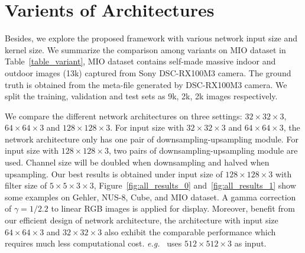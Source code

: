 \documentclass[10pt,twocolumn,letterpaper]{article}
\begin{document}
\section{Varients of Architectures}
Besides, we explore the proposed framework with various network input size and kernel size.
We summarize the comparison among variants on MIO dataset in Table~\ref{table_variant},
MIO dataset contains self-made massive indoor and outdoor images (13k) captured from Sony DSC-RX100M3 camera.
The ground truth is obtained from the meta-file generated by DSC-RX100M3 camera.
We split the training, validation and test sets as 9k, 2k, 2k images respectively.

We compare the different network architectures on three settings: $32\times32\times3$, $64\times64\times3$ and $128\times128\times3$.
For input size with $32\times32\times3$ and $64\times64\times3$, the network architecture only has one pair of downsampling-upsampling module.
For input size with $128\times128\times3$, two pairs of downsampling-upsampling module are used.
Channel size will be doubled when downsampling and halved when upsampling.
Our best results is obtained under input size of $128\times128\times3$ with filter size of $5\times5\times3\times3$,
Figure~\ref{fig:all_results_0} and~\ref{fig:all_results_1} show some examples on Gehler, NUS-8, Cube, and MIO dataset.
A gamma correction of $\gamma = 1/2.2$ to linear RGB images is applied for display.
Moreover, benefit from our efficient design of network architecture,
the architecture with input size $64\times64\times3$ and $32\times32\times3$ also
exhibit the comparable performance which requires much less computational cost.
\textit{e.g.}~\cite{hu2017fc} uses $512\times512\times3$ as input.
\end{document}
